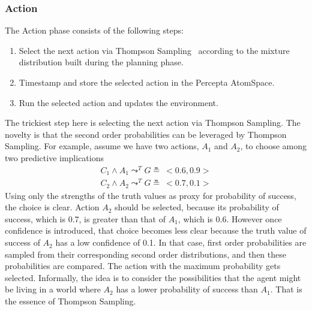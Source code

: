 \documentclass[runningheads]{llncs}
\newcommand{\lpreimp}[1]{\leadsto^{#1}}
\begin{document}
\subsubsection{Action}
The Action phase consists of the following steps:
\begin{enumerate}
\item Select the next action via Thompson Sampling~\cite{Leike2016}
  according to the mixture distribution built during the planning
  phase.
\item Timestamp and store the selected action in the Percepta
  AtomSpace.
\item Run the selected action and updates the environment.
\end{enumerate}
The trickiest step here is selecting the next action via Thompson
Sampling.  The novelty is that the second order probabilities can be
leveraged by Thompson Sampling.  For example, assume we have two
actions, $A_1$ and $A_2$, to choose among two predictive implications
$$
\begin{array}{c}
  C_1 \land A_1 \lpreimp{T} G \measeq\ <\!0.6, 0.9\!> \\
  C_2 \land A_2 \lpreimp{T} G \measeq\ <\!0.7, 0.1\!>
\end{array}
$$
Using only the strengths of the truth values as proxy for probability
of success, the choice is clear.  Action $A_2$ should be selected,
because its probability of success, which is 0.7, is greater than that
of $A_1$, which is 0.6.  However once confidence is introduced, that
choice becomes less clear because the truth value of success of $A_2$
has a low confidence of 0.1.  In that case, first order probabilities
are sampled from their corresponding second order distributions,
and then these probabilities are compared.  The action with the
maximum probability gets selected.  Informally, the idea is to
consider the possibilities that the agent might be living in a world
where $A_2$ has a lower probability of success than $A_1$.  That is
the essence of Thompson Sampling.
\end{document}
